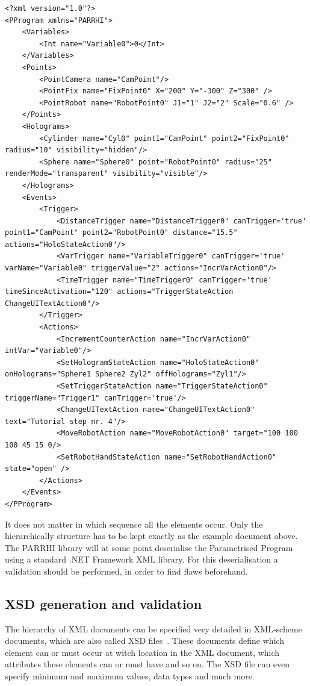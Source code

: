 \begin{lstlisting}
<?xml version="1.0"?>
<PProgram xmlns="PARRHI">
	<Variables>
		<Int name="Variable0">0</Int>
	</Variables>
	<Points>
		<PointCamera name="CamPoint"/>
		<PointFix name="FixPoint0" X="200" Y="-300" Z="300" />
		<PointRobot name="RobotPoint0" J1="1" J2="2" Scale="0.6" />
	</Points>
	<Holograms>
		<Cylinder name="Cyl0" point1="CamPoint" point2="FixPoint0" radius="10" visibility="hidden"/>
		<Sphere name="Sphere0" point="RobotPoint0" radius="25" renderMode="transparent" visibility="visible"/>
	</Holograms>
	<Events>
		<Trigger>
			<DistanceTrigger name="DistanceTrigger0" canTrigger='true' point1="CamPoint" point2="RobotPoint0" distance="15.5" actions="HoloStateAction0"/>
			<VarTrigger name="VariableTrigger0" canTrigger='true' varName="Variable0" triggerValue="2" actions="IncrVarAction0"/>
			<TimeTrigger name="TimeTrigger0" canTrigger='true' timeSinceActivation="120" actions="TriggerStateAction ChangeUITextAction0"/>
		</Trigger>
		<Actions>
			<IncrementCounterAction name="IncrVarAction0" intVar="Variable0"/>
			<SetHologramStateAction name="HoloStateAction0" onHolograms="Sphere1 Sphere2 Zyl2" offHolograms="Zyl1"/>
			<SetTriggerStateAction name="TriggerStateAction0" triggerName="Trigger1" canTrigger='true'/>
			<ChangeUITextAction name="ChangeUITextAction0" text="Tutorial step nr. 4"/>
			<MoveRobotAction name="MoveRobotAction0" target="100 100 100 45 15 0/>
			<SetRobotHandStateAction name="SetRobotHandAction0" state="open" />
		</Actions>
	</Events>
</PProgram>
\end{lstlisting}

It does not matter in which sequence all the elements occur. Only the hierarchically structure has to be kept exactly as the example document above. The PARRHI library will at some point deserialise the Parametrised Program using a standard .NET Framework XML library. For this deserialisation a validation should be performed, in order to find flaws beforehand.

\subsection{XSD generation and validation}
The hierarchy of XML documents can be specified very detailed in XML-scheme documents, which are also called XSD files~\cite{xsdW3C}. These documents define which element can or must occur at witch location in the XML document, which attributes these elements can or must have and so on. The XSD file can even specify minimum and maximum values, data types and much more.

